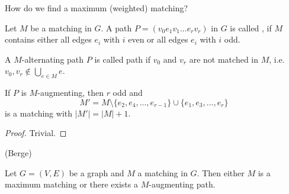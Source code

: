 \begin{qstn}
How do we find a maximum (weighted) matching?
\end{qstn}

\begin{defn} %
Let $M$ be a matching in $G$. A path $P = (v_0 e_1 v_1 ... e_r v_r)$ in $G$
is called , if $M$ contains either
all edges $e_i$ with $i$ even or all edges $e_i$ with $i$ odd.

A $M$-alternating path $P$ is called  path if $v_0$ and
$v_r$ are not matched in $M$, i.e. $v_0, v_r \not\in \bigcup_{e \in M} e$.
\end{defn}

\begin{lem} %
If $P$ is $M$-augmenting, then $r$ odd and
\[
	M' = M \setminus \{ e_2, e_4, ..., e_{r-1} \} \cup \{ e_1, e_3, ..., e_r \}
\]
is a matching with $|M'| = |M| + 1$.
\end{lem}
\begin{proof}
Trivial.
\end{proof}

\begin{lem} %
(Berge)

Let $G = (V, E)$ be a graph and $M$ a matching in $G$.
Then either $M$ is a maximum matching or there exists a $M$-augmenting path.
\end{lem}
